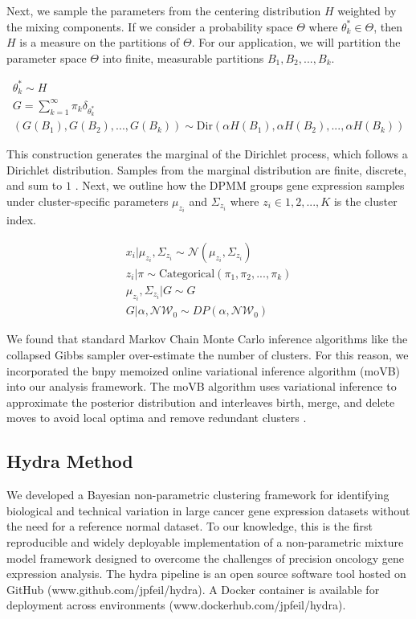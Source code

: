 \documentclass[10pt,letterpaper]{article}
\begin{document}
Next, we sample the parameters from the centering distribution $H$ weighted by the mixing components. If we consider a probability space $\Theta$ where $\theta_k^{*} \in \Theta$, then $H$ is a measure on the partitions of $\Theta$. For our application, we will partition the parameter space $\Theta$ into finite, measurable partitions $B_1, B_2, ..., B_k$. 

\begin{gather}
\theta_k^{*} \sim H \\
G = \sum_{k=1}^{\infty} \pi_k \delta_{\theta_k^{*}} \\
(G(B_1), G(B_2), ..., G(B_k)) \sim \text{Dir}(\alpha H(B_1), \alpha H(B_2), ..., \alpha H(B_k)) 
\end{gather}

This construction generates the marginal of the Dirichlet process, which follows a Dirichlet distribution. Samples from the marginal distribution are finite, discrete, and sum to $1$ \cite{fergusonBayesianAnalysisNonparametric1973}. Next, we outline how the DPMM groups gene expression samples under cluster-specific parameters $\mu_{z_i}$ and $\Sigma_{z_i}$ where $z_i \in {1, 2, ..., K}$ is the cluster index.

\begin{gather}
\label{eq:mm}
x_i | \mu_{z_i}, \Sigma_{z_i} \sim \mathcal{N}(\mu_{z_i}, \Sigma_{z_i}) \\
z_i | \pi \sim \text{Categorical}(\pi_1, \pi_2, ..., \pi_k) \\
\mu_{z_i}, \Sigma_{z_i} | G \sim G \\
G | \alpha, \mathcal{NW}_0 \sim DP(\alpha, \mathcal{NW}_0)
\end{gather}

We found that standard Markov Chain Monte Carlo inference algorithms like the collapsed Gibbs sampler over-estimate the number of clusters. For this reason, we incorporated the bnpy memoized online variational inference algorithm (moVB) \cite{hughes2013memoized} into our analysis framework. The moVB algorithm uses variational inference to approximate the posterior distribution and interleaves birth, merge, and delete moves to avoid local optima and remove redundant clusters \cite{hughesBnpyReliableScalable}. 

\subsection{Hydra Method}

We developed a Bayesian non-parametric clustering framework for identifying biological and technical variation in large cancer gene expression datasets without the need for a reference normal dataset. To our knowledge, this is the first reproducible and widely deployable implementation of a non-parametric mixture model framework designed to overcome the challenges of precision oncology gene expression analysis. The hydra pipeline is an open source software tool hosted on GitHub (www.github.com/jpfeil/hydra). A Docker container is available for deployment across environments (www.dockerhub.com/jpfeil/hydra).
\end{document}
